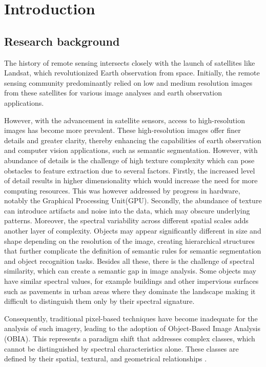 \chapter{Introduction}

\section{Research background}

The history of remote sensing intersects closely with the launch of satellites like Landsat, which revolutionized Earth observation from space. Initially, the remote sensing community predominantly relied on low and medium resolution images from these satellites for various image analyses and earth observation applications.

However, with the advancement in satellite sensors, access to high-resolution images has become more prevalent. These high-resolution images offer finer details and greater clarity, thereby enhancing the capabilities of earth observation and computer vision applications, such as semantic segmentation. However, with abundance of details is the challenge of high texture complexity which can pose obstacles to feature extraction due to several factors. Firstly, the increased level of detail results in higher dimensionality which would increase the need for more computing resources. This was however addressed by progress in hardware, notably the Graphical Processing Unit(GPU). Secondly, the abundance of texture can introduce artifacts and noise into the data, which may obscure underlying patterns. Moreover, the spectral variability across different spatial scales adds another layer of complexity. Objects may appear significantly different in size and shape depending on the resolution of the image, creating hierarchical structures that further complicate the definition of semantic rules for semantic segmentation and object recognition tasks. Besides all these, there is the challenge of spectral similarity, which can create a semantic gap in image analysis. Some objects may have similar spectral values, for example buildings and other impervious surfaces such as pavements in urban areas where they dominate the landscape making it difficult to distinguish them only by their spectral signature.\cite{hossain_segmentation_2019}

Consequently, traditional pixel-based techniques have become inadequate for the analysis of such imagery, leading to the adoption of Object-Based Image Analysis (OBIA). This represents a paradigm shift that addresses complex classes, which cannot be distinguished by spectral characteristics alone. These classes are defined by their spatial, textural, and geometrical relationships \cite{blaschke_object_2010}.

